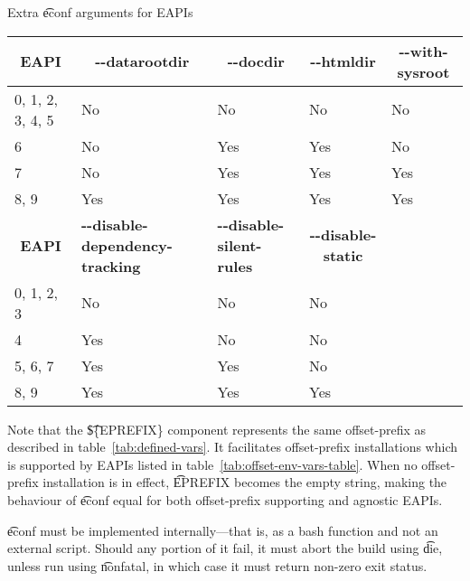 \begin{description}
    \begin{centertable}{Extra \t{econf} arguments for EAPIs}
        \label{tab:econf-options-table}
        \begin{tabular}{lllll}
          \toprule
          \multicolumn{1}{c}{\textbf{EAPI}} &
          \multicolumn{1}{c}{\textbf{-{}-datarootdir}} &
          \multicolumn{1}{c}{\textbf{-{}-docdir}} &
          \multicolumn{1}{c}{\textbf{-{}-htmldir}} &
          \multicolumn{1}{c}{\textbf{-{}-with-sysroot}} \\
          \midrule
          0, 1, 2, 3, 4, 5  & No  & No  & No  & No  \\
          6                 & No  & Yes & Yes & No  \\
          7                 & No  & Yes & Yes & Yes \\
          8, 9              & Yes & Yes & Yes & Yes \\
          \midrule
          \multicolumn{1}{c}{\textbf{EAPI}} &
          \multicolumn{1}{P{5.5em}}{\textbf{-{}-disable-dependency-tracking}} &
          \multicolumn{1}{P{5em}}{\textbf{-{}-disable-silent-rules}} &
          \multicolumn{1}{c}{\textbf{-{}-disable-static}} & \\
          \midrule
          0, 1, 2, 3        & No  & No  & No  & \\
          4                 & Yes & No  & No  & \\
          5, 6, 7           & Yes & Yes & No  & \\
          8, 9              & Yes & Yes & Yes & \\
          \bottomrule
        \end{tabular}
    \end{centertable}

    Note that the \t{\$\{EPREFIX\}} component represents the same offset-prefix as described in
    table~\ref{tab:defined-vars}. It facilitates offset-prefix installations which is supported by
    EAPIs listed in table~\ref{tab:offset-env-vars-table}. When no offset-prefix installation is in
    effect, \t{EPREFIX} becomes the empty string, making the behaviour of \t{econf} equal for both
    offset-prefix supporting and agnostic EAPIs.

    \t{econf} must be implemented internally---that is, as a bash function and not an external
    script. Should any portion of it fail, it must abort the build using \t{die}, unless run using
    \t{nonfatal}, in which case it must return non-zero exit status.


\end{description}
